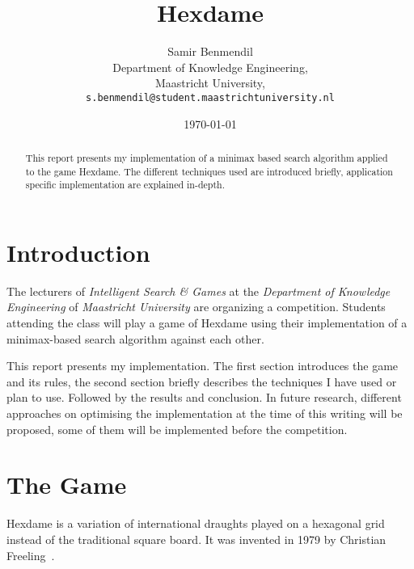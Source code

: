 \documentclass[a4paper,10pt]{article}
\begin{document}
\title{Hexdame}
\author{Samir Benmendil \\
  Department of Knowledge Engineering, \\
  Maastricht University, \\
  \texttt{s.benmendil@student.maastrichtuniversity.nl}}
\date{\today}
\maketitle

\begin{abstract}
This report presents my implementation of a minimax based search algorithm applied to the game Hexdame. The different techniques used are introduced briefly, application specific implementation are explained in-depth.
\end{abstract}

\section{Introduction}
The lecturers of \emph{Intelligent Search \& Games} at the \emph{Department of Knowledge Engineering} of \emph{Maastricht University} are organizing a competition. Students attending the class will play a game of Hexdame using their implementation of a minimax-based search algorithm against each other.

This report presents my implementation. The first section introduces the game and its rules, the second section briefly describes the techniques I have used or plan to use. Followed by the results and conclusion. In future research, different approaches on optimising the implementation at the time of this writing will be proposed, some of them will be implemented before the competition.

\section{The Game} %
Hexdame is a variation of international draughts played on a hexagonal grid instead of the traditional square board. It was invented in 1979 by Christian Freeling~\cite{Freeling2013}.
\end{document}
